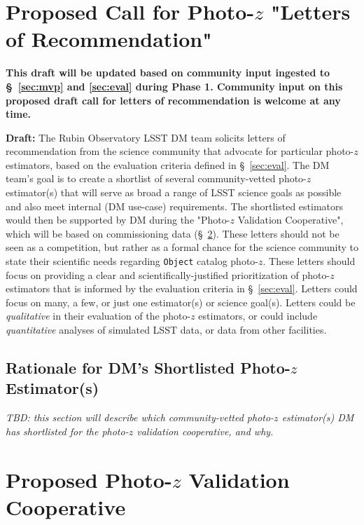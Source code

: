 \documentclass[DM,lsstdraft,toc]{lsstdoc}
\begin{document}
\clearpage
\section{Proposed Call for Photo-$z$ "Letters of Recommendation"} \label{sec:lor}

\textbf{This draft will be updated based on community input ingested to \S~\ref{sec:mvp} and \ref{sec:eval} during Phase 1.
Community input on this proposed draft call for letters of recommendation is welcome at any time.}

\textbf{Draft:} The Rubin Observatory LSST DM team solicits letters of recommendation from the science community that advocate for particular photo-$z$ estimators, based on the evaluation criteria defined in \S~\ref{sec:eval}.
The DM team's goal is to create a shortlist of several community-vetted photo-$z$ estimator(s) that will serve as broad a range of LSST science goals as possible and also meet internal (DM use-case) requirements.
The shortlisted estimators would then be supported by DM during the "Photo-$z$ Validation Cooperative", which will be based on commissioning data (\S~\ref{sec:pzcoop}). 
These letters should not be seen as a competition, but rather as a formal chance for the science community to state their scientific needs regarding {\tt Object} catalog photo-$z$. 
These letters should focus on providing a clear and scientifically-justified prioritization of photo-$z$ estimators that is informed by the evaluation criteria in  \S~\ref{sec:eval}.
Letters could focus on many, a few, or just one estimator(s) or science goal(s).
Letters could be {\it qualitative} in their evaluation of the photo-$z$ estimators, or could include {\it quantitative} analyses of simulated LSST data, or data from other facilities.

\subsection{Rationale for DM's Shortlisted Photo-$z$ Estimator(s)} \label{ssec:lor_choice}

\textit{TBD: this section will describe which community-vetted photo-$z$ estimator(s) DM has shortlisted for the photo-$z$ validation cooperative, and why.}


\clearpage
\section{Proposed Photo-$z$ Validation Cooperative}\label{sec:pzcoop}
\end{document}
